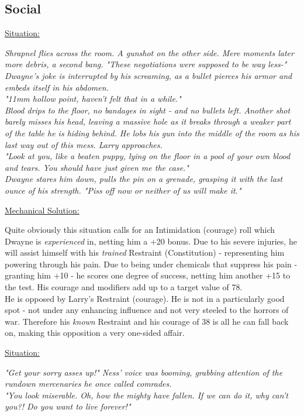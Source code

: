 \documentclass[12pt,a4paper,openany]{book}
\begin{document}
	\subsection*{Social}
	\ul{Situation:}
	\begin{exampleblock}
		\textit{Shrapnel flies across the room. A gunshot on the other side. Mere moments later more debris, a second bang. 
		"These negotiations were supposed to be way less-"\\
		Dwayne's joke is interrupted by his screaming, as a bullet pierces his armor and embeds itself in his abdomen.\\
		"11mm hollow point, haven't felt that in a while."\\
		Blood drips to the floor, no bandages in sight - and no bullets left. Another shot barely misses his head, leaving a massive hole as it breaks through a weaker part of the table he is hiding behind. He lobs his gun into the middle of the room as his last way out of this mess. Larry approaches.\\
		"Look at you, like a beaten puppy, lying on the floor in a pool of your own blood and tears. You should have just given me the case."\\
		Dwayne stares him down, pulls the pin on a grenade, grasping it with the last ounce of his strength. 
		"Piss off now or neither of us will make it."}
	\end{exampleblock}
	\ul{Mechanical Solution:}
	\begin{exampleblock}
		Quite obviously this situation calls for an Intimidation (courage) roll which Dwayne is \emph{experienced} in, netting him a +20 bonus. Due to his severe injuries, he will assist himself with his \emph{trained} Restraint (Constitution) - representing him powering through his pain. Due to being under chemicals that suppress his pain - granting him +10 - he scores one degree of success, netting him another +15 to the test. His courage and modifiers add up to a target value of 78.\\
		He is opposed by Larry's Restraint (courage). He is not in a particularly good spot - not under any enhancing influence and not very steeled to the horrors of war. Therefore his \emph{known} Restraint and his courage of 38 is all he can fall back on, making this opposition a very one-sided affair.
	\end{exampleblock}
	\breakline
	\ul{Situation:}
	\begin{exampleblock}
		\textit{"Get your sorry asses up!" Ness' voice was booming, grabbing attention of the rundown mercenaries he once called comrades.\\
		"You look miserable. Oh, how the mighty have fallen. If we can do it, why can't you?! Do you want to live forever!"}
	\end{exampleblock}
\end{document}
